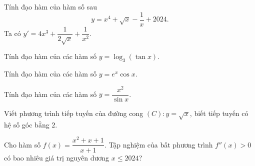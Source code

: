 \begin{bt}%
	Tính đạo hàm của hàm số sau
	\[y=x^4+\sqrt{x}-\dfrac{1}{x}+2024.\]
	\loigiai
	{
		Ta có $y'=4x^3+\dfrac{1}{2\sqrt{x}}+\dfrac{1}{x^2}$.
	}
\end{bt}

\begin{bt}%
	Tính đạo hàm của các hàm số $y=\log_3(\tan x)$.
\end{bt}

\begin{bt}%
	Tính đạo hàm của các hàm số $y=e^x \cos x$.
\end{bt}

\begin{bt}%
	Tính đạo hàm của các hàm số $y=\dfrac{x^2}{\sin x}$.
\end{bt}

\begin{bt}%
	Viết phương trình tiếp tuyến của đường cong $(C)\colon y=\sqrt{x}$, biết tiếp tuyến có hệ số góc bằng $2$.
\end{bt}

\begin{bt}%
Cho hàm số $f(x)=\dfrac{x^2+x+1}{x+1}$. Tập nghiệm của bất phương trình $f''(x)>0$ có bao nhiêu giá trị nguyên dương $x\le2024$?
\end{bt}

